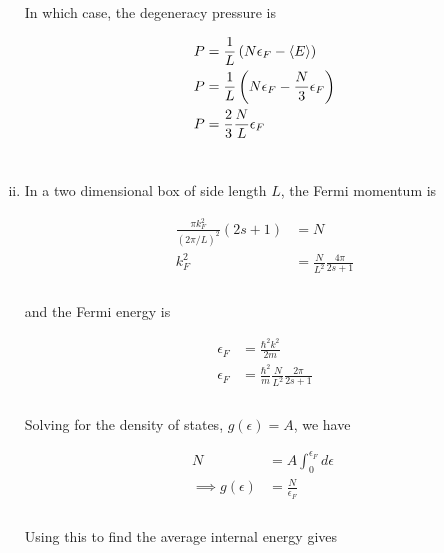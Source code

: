 \documentclass[]{article}
\begin{document}
\begin{enumerate}[i.]
In which case, the degeneracy pressure is

\begin{equation}\label{eq:14}
\begin{aligned}
P & = \frac{1}{L} \left( N \epsilon_F -  \expval{E}\right) \\
P & = \frac{1}{L} \left( N \epsilon_F -  \frac{N}{3} \epsilon_F \right) \\
P & = \frac{2}{3} \frac{N}{L} \epsilon_F \\
\end{aligned}
\end{equation} \\

\item In a two dimensional box of side length $L$, the Fermi momentum is

\begin{equation}\label{eq:15}
\begin{aligned}
\frac{\pi k_F^2 }{ (2\pi/L)^2 } (2s+1) & = N \\
k_F^2 & = \frac{N}{L^2} \frac{4 \pi }{2s+1 } \\
\end{aligned}
\end{equation} \\

and the Fermi energy is


\begin{equation}\label{eq:16}
\begin{aligned}
\epsilon_F & = \frac{\hbar^2 k^2}{2m} \\
\epsilon_F & = \frac{\hbar^2 }{m}   \frac{N}{L^2} \frac{2 \pi }{2s+1 } \\
\end{aligned}
\end{equation} \\

Solving for the density of states, $g(\epsilon) = A $, we have

\begin{equation}\label{eq:17}
\begin{aligned}
N & = A \int_0^{\epsilon_F} d\epsilon \;  \\
\implies g(\epsilon) & = \frac{N}{\epsilon_F} \\
\end{aligned}
\end{equation} \\

Using this to find the average internal energy gives


\end{enumerate}
\end{document}

